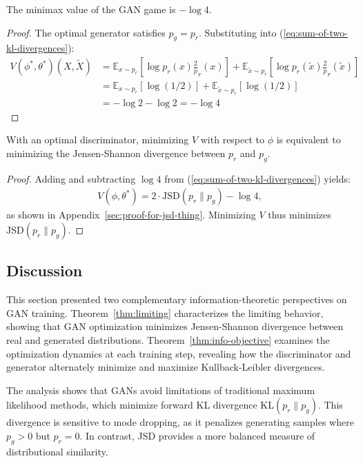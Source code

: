 \begin{lemma}
	The minimax value of the GAN game is $-\log 4$.
\end{lemma}
\begin{proof}
	The optimal generator satisfies $p_g = p_r$. Substituting into (\ref{eq:sum-of-two-kl-divergences}):
	\begin{align}
		V(\phi^*, \theta^*)(X, \tilde{X}) & = \mathbb{E}_{x \sim p_r}\left[\log{p_r(x) \frac 2p_r(x)}\right] + \mathbb{E}_{\tilde{x} \sim p_r}\left[\log{p_r(\tilde{x}) \frac 2p_r(\tilde{x})}\right] \\
		                                  & = \mathbb{E}_{x \sim p_r}[\log(1/2)] + \mathbb{E}_{\tilde{x} \sim p_r}[\log(1/2)]                                                                         \\
		                                  & = -\log 2 - \log 2 = -\log 4
	\end{align}
\end{proof}

\begin{theorem}%
	\label{thm:limiting}
	With an optimal discriminator, minimizing $V$ with respect to $\phi$ is equivalent to minimizing the Jensen-Shannon divergence between $p_r$ and $p_g$.
\end{theorem}
\begin{proof}
	Adding and subtracting $\log 4$ from (\ref{eq:sum-of-two-kl-divergences}) yields:
	\begin{align}
		\label{eq:desired}
		V(\phi, \theta^*) = 2 \cdot \text{JSD}(p_r \| p_g) - \log 4,
	\end{align}
	as shown in Appendix~\ref{sec:proof-for-jsd-thing}. Minimizing $V$ thus minimizes $\text{JSD}(p_r \| p_g)$.
\end{proof}

\subsection{Discussion}
This section presented two complementary information-theoretic perspectives on GAN training. Theorem~\ref{thm:limiting} characterizes the limiting behavior, showing that GAN optimization minimizes Jensen-Shannon divergence between real and generated distributions. Theorem~\ref{thm:info-objective} examines the optimization dynamics at each training step, revealing how the discriminator and generator alternately minimize and maximize Kullback-Leibler divergences.

The analysis shows that GANs avoid limitations of traditional maximum likelihood methods, which minimize forward KL divergence $\text{KL}(p_r \| p_g)$. This divergence is sensitive to mode dropping, as it penalizes generating samples where $p_g > 0$ but $p_r = 0$. In contrast, JSD provides a more balanced measure of distributional similarity.

